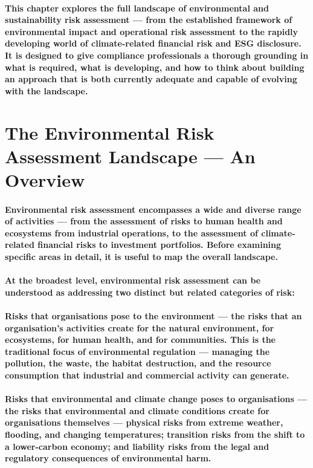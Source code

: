 \paragraph{This chapter explores the full landscape of environmental and sustainability risk assessment — from the established framework of environmental impact and operational risk assessment to the rapidly developing world of climate-related financial risk and ESG disclosure. It is designed to give compliance professionals a thorough grounding in what is required, what is developing, and how to think about building an approach that is both currently adequate and capable of evolving with the landscape.}

\section{The Environmental Risk Assessment Landscape — An Overview}
\paragraph{Environmental risk assessment encompasses a wide and diverse range of activities — from the assessment of risks to human health and ecosystems from industrial operations, to the assessment of climate-related financial risks to investment portfolios. Before examining specific areas in detail, it is useful to map the overall landscape.}
\paragraph{At the broadest level, environmental risk assessment can be understood as addressing two distinct but related categories of risk:}
\paragraph{\textbf{Risks that organisations pose to the environment} — the risks that an organisation's activities create for the natural environment, for ecosystems, for human health, and for communities. This is the traditional focus of environmental regulation — managing the pollution, the waste, the habitat destruction, and the resource consumption that industrial and commercial activity can generate.}
\paragraph{\textbf{Risks that environmental and climate change poses to organisations} — the risks that environmental and climate conditions create for organisations themselves — physical risks from extreme weather, flooding, and changing temperatures; transition risks from the shift to a lower-carbon economy; and liability risks from the legal and regulatory consequences of environmental harm.}
